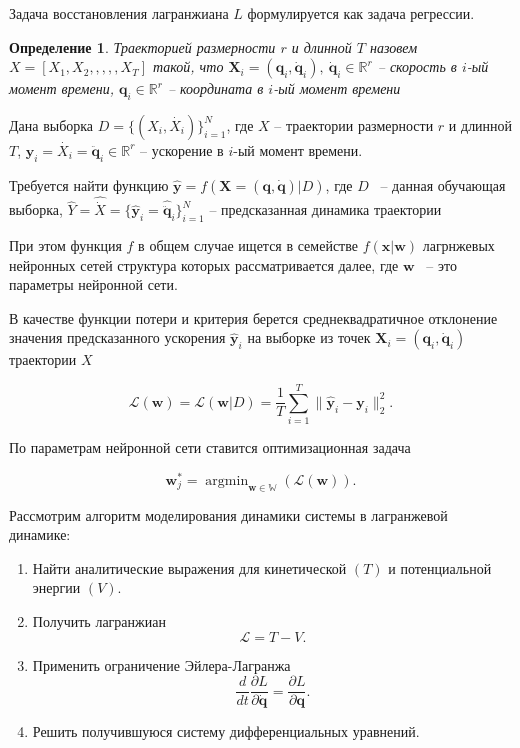 \documentclass[a4paper, 12pt]{article}
\newcommand\argmin{\mathop{\arg\min}}
\newtheorem{definition}{Определение}
\begin{document}
Задача восстановления лагранжиана $L$ формулируется как задача регрессии.

\begin{definition} \label{definition:trajectory}
Траекторией размерности $r$ и длинной $T$ назовем $X = [X_1, X_2, ,,,, X_T]$ такой, что
$\mathbf{X}_i = (\mathbf{q}_i, \mathbf{\dot{q}}_i),\ \mathbf{\dot{q}}_i \in \mathbb{R}^r$ -- скорость в $i$-ый момент времени, $\mathbf{q}_i \in \mathbb{R}^r$ -- координата в $i$-ый момент времени
\end{definition}

Дана выборка
$D = \{(X_i, \dot{X_i})\}_{i=1}^N$, где $X$ -- траектории размерности $r$ и длинной $T$, $\mathbf{y}_i = \dot{X_i} = \ddot{\mathbf{q}}_i \in \mathbb{R}^r$ -- ускорение в $i$-ый момент времени.

Требуется найти функцию $\hat{\mathbf{y}}  = f(\mathbf{X} = (\mathbf{q}, \mathbf{\dot{q}}) | D)$, где $D$ ~-- данная обучающая выборка, $\hat{Y} =\hat{\dot{X}} = \{\hat{\mathbf{y}}_i = \hat{\ddot{\mathbf{q}}}_i\}_{i=1}^N$ -- предсказанная динамика траектории

При этом функция $f$ в общем случае ищется в семействе $f(\mathbf{x}|\mathbf{w})$ лагрнжевых нейронных сетей структура которых рассматривается далее, где $\mathbf{w}$ ~-- это параметры нейронной сети.

В качестве функции потери и критерия берется среднеквадратичное отклонение значения предсказанного ускорения $\hat{\mathbf{y}}_i$ на выборке из точек $\mathbf{X}_i = (\mathbf{q}_i, \mathbf{\dot{q}}_i)$ траектории $X$

\begin{equation}
 \mathcal{L}(\textbf{w}) = \mathcal{L}(\mathbf{w} | D) = \frac{1}{T}\sum_{i=1}^{T} \| \hat{\mathbf{y}}_i - \mathbf{y}_i \|_2^2.
\end{equation}



По параметрам нейронной сети ставится оптимизационная задача

\begin{equation} 
\label{eq:opt_task}
\textbf{w}_j^* = \argmin_{\mathbf{w} \in \mathbb{W}} \left( \mathcal{L}(\textbf{w}) \right). 
\end{equation}


Рассмотрим алгоритм моделирования динамики системы в лагранжевой динамике:
\begin{enumerate}
	\item Найти аналитические выражения для кинетической $(T)$ и потенциальной энергии $(V)$.
	\item Получить лагранжиан \[\mathcal{L} = T - V .\]
	\item Применить ограничение Эйлера-Лагранжа \[\frac{d}{d t} \frac{\partial L}{\partial \mathbf{\dot{q}}} =\frac{\partial L}{\partial \mathbf{q}}.\]
	\item Решить получившуюся систему дифференциальных уравнений.
\end{enumerate}
\end{document}
